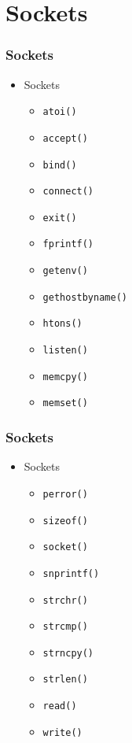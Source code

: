\documentclass[xcolor=table, notheorems, hyperref={pdfpagelabels=false}]{beamer}
\begin{document}
\section{Sockets}
\begin{frame}
\frametitle{Sockets}
\begin{itemize}
\item Sockets
\begin{itemize}
\item \texttt{atoi()}
\item \texttt{accept()}
\item \texttt{bind()}
\item \texttt{connect()}
\item \texttt{exit()}
\item \texttt{fprintf()}
\item \texttt{getenv()}
\item \texttt{gethostbyname()}
\item \texttt{htons()}
\item \texttt{listen()}
\item \texttt{memcpy()}
\item \texttt{memset()}
\end{itemize}
\end{itemize}
\end{frame}

\begin{frame}
\frametitle{Sockets}
\begin{itemize}
\item Sockets
\begin{itemize}
\item \texttt{perror()}
\item \texttt{sizeof()}
\item \texttt{socket()}
\item \texttt{snprintf()}
\item \texttt{strchr()}
\item \texttt{strcmp()}
\item \texttt{strncpy()}
\item \texttt{strlen()}
\item \texttt{read()}
\item \texttt{write()}
\end{itemize}
\end{itemize}
\end{frame}

\end{document}
